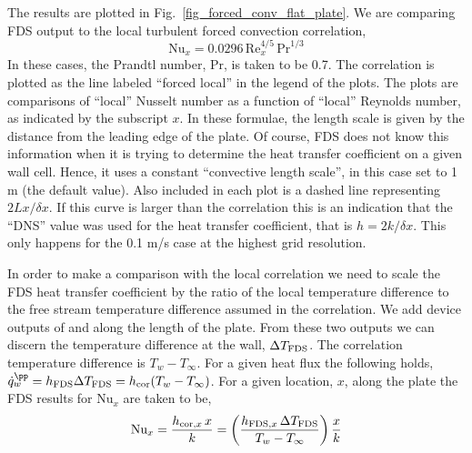 \documentclass[11pt]{book}
\begin{document}
The results are plotted in Fig.~\ref{fig_forced_conv_flat_plate}.  We are comparing FDS output to the local turbulent forced convection correlation,
\begin{equation}
\label{eq:local_forced_flat_plate_cor}
\mbox{Nu}_x = 0.0296 \, \mbox{Re}_x^{4/5} \, \mbox{Pr}^{1/3}
\end{equation}
In these cases, the Prandtl number, Pr, is taken to be 0.7.  The correlation is plotted as the line labeled ``forced local'' in the legend of the plots.  The plots are comparisons of ``local'' Nusselt number as a function of ``local'' Reynolds number, as indicated by the subscript $x$.  In these formulae, the length scale is given by the distance from the leading edge of the plate.  Of course, FDS does not know this information when it is trying to determine the heat transfer coefficient on a given wall cell.  Hence, it uses a constant ``convective length scale'', in this case set to 1 m (the default value).  Also included in each plot is a dashed line representing $2Lx/\delta x$.  If this curve is larger than the correlation this is an indication that the ``DNS'' value was used for the heat transfer coefficient, that is $h = 2k/\delta x$.  This only happens for the 0.1 m/s case at the highest grid resolution.

In order to make a comparison with the local correlation we need to scale the FDS heat transfer coefficient by the ratio of the local temperature difference to the free stream temperature difference assumed in the correlation.  We add device outputs of  and  along the length of the plate.  From these two outputs we can discern the temperature difference at the wall, $\Delta T_{\mbox{\scriptsize FDS}}$.  The correlation temperature difference is $T_w - T_\infty$.  For a given heat flux the following holds, $\dot{q}_w^{\pp} = h_{\mbox{\scriptsize FDS}} \Delta T_{\mbox{\scriptsize FDS}} = h_{\mbox{\scriptsize cor}} (T_w - T_\infty)$.  For a given location, $x$, along the plate the FDS results for $\mbox{Nu}_x$ are taken to be,
\begin{equation}
\label{eq:Nu_scaling}
\mbox{Nu}_x = \frac{h_{\mbox{\scriptsize cor},x} \, x}{k} = \left( \frac{h_{\mbox{\scriptsize FDS},x} \, \Delta T_{\mbox{\scriptsize FDS}}}{T_w - T_\infty} \right) \frac{x}{k}
\end{equation}
\end{document}
